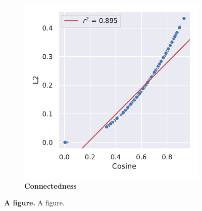 \begin{figure}
\begin{adjustbox}{minipage=\dimexpr{}\fboxrule,fbox}
\begin{subfigure}[b]{0.475\textwidth}
            \includegraphics[width=\textwidth]{UMAP/Difference_Distance_Calculation.pdf}
            \caption[Connectedness]{\textbf{Connectedness}}
            \label{fig:2.4.1b}
        \end{subfigure}
    \end{adjustbox}
    \caption[A figure]{\textbf{A figure.} A figure.}
    \label{fig:2.4.1}
\end{figure}